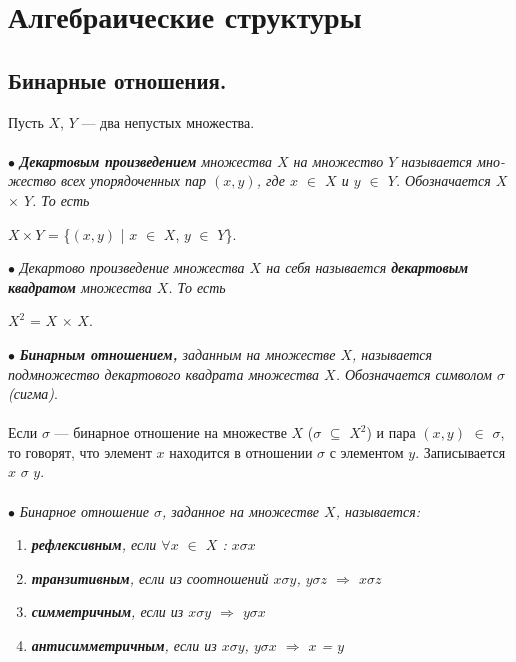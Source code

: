 














\chapter{Алгебраические структуры}

\section{Бинарные отношения.}
Пусть $X$, $Y$ --- два непустых множества.\\\\
$\bullet$ \textit{\textbf{Декартовым произведением} множества $X$ на множество $Y$ называется мно- } \\ \textit{жество всех упорядоченных пар $(x,y)$, где $x$ $\in$ $X$ и $y$ $\in$ $Y$. Обозначается $X$ $\times$ $Y$. То есть}
\begin{center}
	$X\times Y$ = \{$(x,y)$ | $x$ $\in$ $X$, $y$ $\in$ $Y$\}.   
\end{center}
$\bullet$ \textit{Декартово произведение множества $X$ на себя называется \textbf{декартовым квадратом} множества $X$. То есть}
\begin{center}
	$X^2$ = $X$ $\times$ $X$.
\end{center}
$\bullet$ \textit{\textbf{Бинарным отношением,} заданным на множестве $X$, называется подмножество декартового квадрата множества $X$. Обозначается символом $\sigma$ (сигма)}.\\\\
Если $\sigma$ --- бинарное отношение на множестве $X$ ($\sigma$ $\subseteq$ $X^2$) и пара $(x,y)$ $\in$ $\sigma$, то говорят, что элемент $x$ находится в отношении $\sigma$ с элементом $y$. Записывается $x$ $\sigma$ $y$.\\\\
$\bullet$ \textit{Бинарное отношение $\sigma$, заданное на множестве $X$, называется:}
\begin{enumerate}
	\item \textit{\textbf{рефлексивным}, если $\forall x$ $\in$ $X$ : $x\sigma x$}
	\item \textit{\textbf{транзитивным}, если из соотношений $x \sigma y$, $y \sigma z$ $\Rightarrow$ $x$$\sigma$$z$}
	\item \textit{\textbf{симметричным}, если из $x$$\sigma$$y$ $\Rightarrow$ $y$$\sigma$$x$}
	\item \textit{\textbf{антисимметричным}, если из $x$$\sigma$$y$, $y$$\sigma$$x$ $\Rightarrow$ $x$ = $y$}
\end{enumerate}
